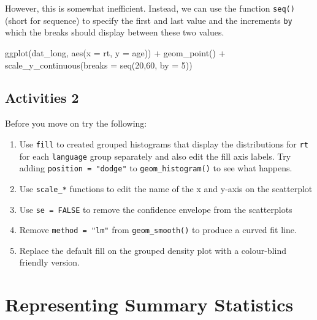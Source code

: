 \documentclass[
  english,
  doc,floatsintext]{apa6}
\newenvironment{Shaded}{\begin{snugshade}}{\end{snugshade}}
\newcommand{\AttributeTok}[1]{\textcolor[rgb]{0.77,0.63,0.00}{#1}}
\newcommand{\DecValTok}[1]{\textcolor[rgb]{0.00,0.00,0.81}{#1}}
\newcommand{\FunctionTok}[1]{\textcolor[rgb]{0.00,0.00,0.00}{#1}}
\newcommand{\NormalTok}[1]{#1}
\newcommand{\SpecialCharTok}[1]{\textcolor[rgb]{0.00,0.00,0.00}{#1}}
\begin{document}
However, this is somewhat inefficient. Instead, we can use the function \texttt{seq()} (short for sequence) to specify the first and last value and the increments \texttt{by} which the breaks should display between these two values.

\begin{Shaded}
\begin{Highlighting}[]
\FunctionTok{ggplot}\NormalTok{(dat\_long, }\FunctionTok{aes}\NormalTok{(}\AttributeTok{x =}\NormalTok{ rt, }\AttributeTok{y =}\NormalTok{ age)) }\SpecialCharTok{+}
  \FunctionTok{geom\_point}\NormalTok{() }\SpecialCharTok{+}
  \FunctionTok{scale\_y\_continuous}\NormalTok{(}\AttributeTok{breaks =} \FunctionTok{seq}\NormalTok{(}\DecValTok{20}\NormalTok{,}\DecValTok{60}\NormalTok{, }\AttributeTok{by =} \DecValTok{5}\NormalTok{))}
\end{Highlighting}
\end{Shaded}

\hypertarget{activities-2}{%
\subsection{Activities 2}\label{activities-2}}

Before you move on try the following:

\begin{enumerate}
\def\labelenumi{\arabic{enumi}.}
\item
  Use \texttt{fill} to created grouped histograms that display the distributions for \texttt{rt} for each \texttt{language} group separately and also edit the fill axis labels. Try adding \texttt{position\ =\ "dodge"} to \texttt{geom\_histogram()} to see what happens.
\item
  Use \texttt{scale\_*} functions to edit the name of the x and y-axis on the scatterplot
\item
  Use \texttt{se\ =\ FALSE} to remove the confidence envelope from the scatterplots
\item
  Remove \texttt{method\ =\ "lm"} from \texttt{geom\_smooth()} to produce a curved fit line.
\item
  Replace the default fill on the grouped density plot with a colour-blind friendly version.
\end{enumerate}

\hypertarget{representing-summary-statistics}{%
\section{Representing Summary Statistics}\label{representing-summary-statistics}}
\end{document}
